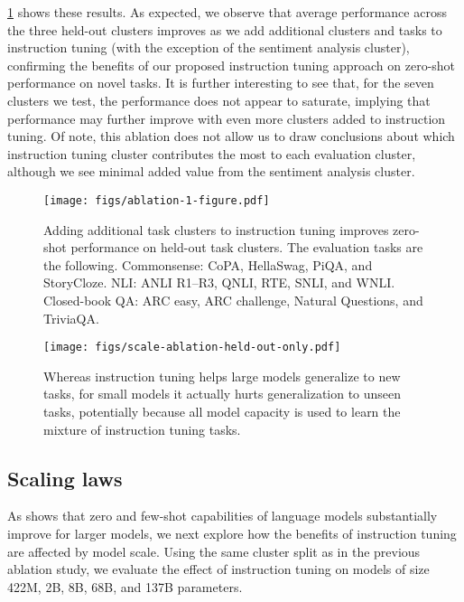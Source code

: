\cref{fig:flan-ablation-numtasks} shows these results.
As expected, we observe that average performance across the three held-out clusters improves as we add additional clusters and tasks to instruction tuning (with the exception of the sentiment analysis cluster), confirming the benefits of our proposed instruction tuning approach on zero-shot performance on novel tasks.
It is further interesting to see that, for the seven clusters we test, the performance does not appear to saturate, implying that performance may further improve with even more clusters added to instruction tuning.
Of note, this ablation does not allow us to draw conclusions about which instruction tuning cluster contributes the most to each evaluation cluster, although we see minimal added value from the sentiment analysis cluster.

\begin{figure}[h]
    \centering
    \texttt{[image: figs/ablation-1-figure.pdf]}
    \vspace{-2mm}
    \caption{Adding additional task clusters to instruction tuning improves zero-shot performance on held-out task clusters. 
    The evaluation tasks are the following. 
    Commonsense: CoPA, HellaSwag, PiQA, and StoryCloze. NLI: ANLI R1--R3, QNLI, RTE, SNLI, and WNLI. Closed-book QA: ARC easy, ARC challenge, Natural Questions, and TriviaQA.}
    \label{fig:flan-ablation-numtasks}
\end{figure}
\vspace{-2mm}

\begin{wrapfigure}{r}{0.53\textwidth}
    \centering
    \vspace{-13mm}
    \texttt{[image: figs/scale-ablation-held-out-only.pdf]}
    \vspace{-7mm}
    \caption{
    Whereas instruction tuning helps large models generalize to new tasks, for small models it actually hurts generalization to unseen tasks, potentially because all model capacity is used to learn the mixture of instruction tuning tasks. 
    }
    \vspace{-6mm}
    \label{fig:scale-ablation}
\end{wrapfigure}

\subsection{Scaling laws}\label{subsec:scaling_laws}

As \citet{brown2020language} shows that zero and few-shot capabilities of language models substantially improve for larger models, we next explore how the benefits of instruction tuning are affected by model scale. 
Using the same cluster split as in the previous ablation study, we evaluate the effect of instruction tuning on models of size 422M, 2B, 8B, 68B, and 137B parameters. 

